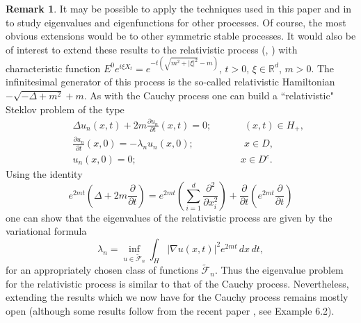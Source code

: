 \documentclass[11pt,leqno]{article}
\theoremstyle{definition}
\newtheorem{rem}{Remark}[section]
\newcommand{\Rd}{\mathbb{R}^d}
\numberwithin{equation}{section}
\begin{document}
\begin{rem}
It may be possible to apply the techniques used in this paper and in \cite{BK} to study
eigenvalues and eigenfunctions  for other processes.  Of course, the most obvious 
extensions would be to other symmetric stable processes.  It would also 
be of interest  to extend  these results 
to the relativistic process (\cite{CMS}, \cite{R}) with characteristic
function
 $E^0 e^{i \xi X_t} = e^{- t
(\sqrt{m^2 + |\xi|^2} - m)}$, $t > 0$, $\xi \in \Rd$, $m > 0$.
The infinitesimal generator of this
process is the so-called relativistic Hamiltonian $- \sqrt{- \Delta + m^2} + m$. As with  the
Cauchy process one can build a ``relativistic" Steklov problem  of the
type
\begin{eqnarray*}
&&
\Delta u_n(x, t)+ 2 m \frac{\partial u_n}{\partial t}(x,t)  =  0;
\quad \quad    \, \,  \quad (x,t) \in H_{+},
\\ &&
\frac{\partial u_n}{\partial t} (x,0)   =  - \lambda_{n} u_n(x,0);
\quad  \quad \quad \quad \quad \, x \in  D,
\\ &&
u_{n}(x,0)   =  0;
\quad \quad \quad \quad \quad \quad \quad \quad \quad \, \, \, \, 
\quad x \in D^{c}.
\end{eqnarray*}
Using the identity  
$$
e^{2 m t} \left( \Delta + 2 m \frac{\partial}{\partial t} \right)
= e^{2 m t} \left( \sum_{i = 1}^{d} \frac{\partial^2}{\partial x_i^2} \right) 
+ \frac{\partial}{\partial t} \left( e^{2 m t} \frac{\partial}{\partial t} \right) 
$$
one can show that the eigenvalues of the relativistic process are given by the variational 
formula 
$$
\lambda_{n} = \inf_{u \in \tilde{\mathcal{F}}_n} \int_{H} |\nabla 
u(x,t)|^{2} e^{2 m t} \, dx \, dt,
$$
for an appropriately chosen class of functions $\tilde{\mathcal{F}}_n$.
Thus  the eigenvalue problem for the relativistic process 
is similar to that of  the Cauchy process. Nevertheless, extending the results which we now have for the Cauchy
process remains mostly open  (although some results follow from   the recent paper 
 \cite{CS3}, see Example 6.2). 
\end{rem}
\end{document}
